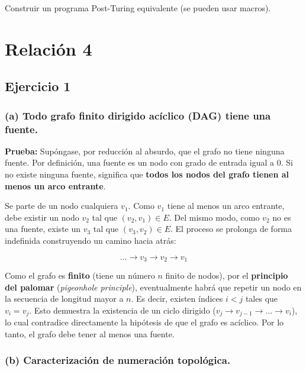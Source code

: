 \documentclass[12pt]{book} %
\begin{document}
Construir un programa Post-Turing equivalente (se pueden usar macros).

\hypertarget{relaciuxf3n-4}{%
\section{Relación 4}\label{relaciuxf3n-4}}

\hypertarget{ejercicio-1-1}{%
\subsection{Ejercicio 1}\label{ejercicio-1-1}}

\hypertarget{a-todo-grafo-finito-dirigido-acuxedclico-dag-tiene-una-fuente.}{%
\subsubsection{(a) Todo grafo finito dirigido acíclico (DAG) tiene una
fuente.}\label{a-todo-grafo-finito-dirigido-acuxedclico-dag-tiene-una-fuente.}}

\textbf{Prueba:} Supóngase, por reducción al absurdo, que el grafo no
tiene ninguna fuente. Por definición, una fuente es un nodo con grado de
entrada igual a 0. Si no existe ninguna fuente, significa que
\textbf{todos los nodos del grafo tienen al menos un arco entrante}.

Se parte de un nodo cualquiera \(v_1\). Como \(v_1\) tiene al menos un
arco entrante, debe existir un nodo \(v_2\) tal que
\((v_2, v_1) \in E\). Del mismo modo, como \(v_2\) no es una fuente,
existe un \(v_3\) tal que \((v_3, v_2) \in E\). El proceso se prolonga
de forma indefinida construyendo un camino hacia atrás:

\[\dots \longrightarrow v_3 \longrightarrow v_2 \longrightarrow v_1\]

Como el grafo es \textbf{finito} (tiene un número \(n\) finito de
nodos), por el \textbf{principio del palomar} (\emph{pigeonhole
principle}), eventualmente habrá que repetir un nodo en la secuencia de
longitud mayor a \(n\). Es decir, existen índices \(i < j\) tales que
\(v_i = v_j\). Esto demuestra la existencia de un ciclo dirigido
(\(v_j \rightarrow v_{j-1} \rightarrow \dots \rightarrow v_i\)), lo cual
contradice directamente la hipótesis de que el grafo es acíclico. Por lo
tanto, el grafo debe tener al menos una fuente.

\hypertarget{b-caracterizaciuxf3n-de-numeraciuxf3n-topoluxf3gica.}{%
\subsubsection{(b) Caracterización de numeración
topológica.}\label{b-caracterizaciuxf3n-de-numeraciuxf3n-topoluxf3gica.}}
\end{document}
